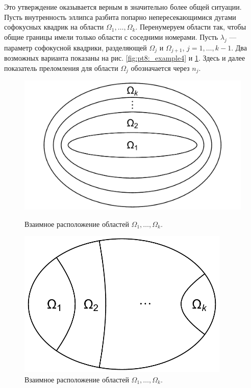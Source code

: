 Это утверждение оказывается верным в значительно более общей ситуации.
Пусть внутренность эллипса разбита попарно непересекающимися дугами софокусных квадрик на области $\Omega_1, \ldots, \Omega_k$.  Перенумеруем области так, чтобы общие границы имели только области с соседними номерами. Пусть $\lambda_j$ --- параметр софокусной квадрики, разделяющей $\Omega_j$ и $\Omega_{j+1}$, $j=1, \ldots, k-1$. Два возможных варианта показаны на рис. \ref{fig:pt8:_example4} и \ref{fig:pt8:_example5}. Здесь и далее показатель преломления для области $\Omega_j$ обозначается через $n_j$.
\begin{figure}[!htb]
   \includegraphics[width=1\textwidth]{images/section1/multiple ellipses.pdf}
    \caption{Взаимное расположение областей $\Omega_1, \ldots, \Omega_k$.}
    \label{fig:pt8:_example4}
\endminipage\hfill
{}
    \includegraphics[width=0.9\textwidth]{images/section1/multiple hyperbolas.pdf}   
    \caption{Взаимное расположение областей $\Omega_1, \ldots, \Omega_k$.}
    \label{fig:pt8:_example5}
\endminipage\hfill
\end{figure}


